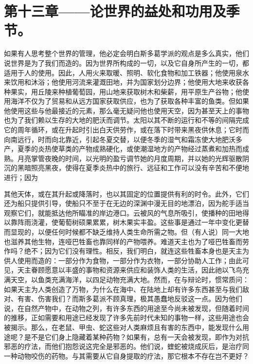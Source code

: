 \section{第十三章——论世界的益处和功用及季节。}

如果有人思考整个世界的管理，他必定会明白斯多葛学派的观点是多么真实，他们说世界是为了我们而造的。因为世界所构成的一切，以及它自身所产生的一切，都适用于人的使用。因此，人用火来取暖、照明、软化食物和加工铁器；他使用泉水来饮用和沐浴；他使用河流来灌溉田地，并为国家划分边界；他使用大地来收获各种果实，用丘陵来种植葡萄园，用山地来获取树木和柴薪，用平原生产谷物；他使用海洋不仅为了贸易和从远方国家获取供应，也为了获取各种丰富的鱼类。但如果他使用这些与他最接近的元素，那么毫无疑问他也使用天空，因为甚至天上的事物也为了我们赖以生存的大地的肥沃而调节。太阳以其不断的运行和不等的间隔完成它的周年循环，或在升起时引出白天供劳作，或在落下时带来黑夜供休息；它时而向南远行，时而向北靠近，引起冬夏交替，以便冬季的湿气和霜冻使大地肥沃多产，夏季的炎热使草类的产物成熟硬化，或使潮湿地方的产物经过蒸煮和加热而成熟。月亮掌管夜晚的时间，以光明的盈亏调节她的月度周期，并以她的光辉驱散阴沉的黑暗照亮黑夜，使得在夏季炎热中的旅行、远征和工作可以没有辛苦和不便地进行；因为\par

\par

其他天体，或在其升起或降落时，也以其固定的位置提供有利的时令。此外，它们还为船只提供引导，使船只不至于在无边的深渊中漫无目的地漂泊，因为舵手适当观察它们，就能抵达他所瞄准的岸边港口。云被风的气息所吸引，使播种的田地得以靠阵雨浇灌，使葡萄树硕果累累，树木果实丰盈。这些事是通过一年中变化更替而显现的，以便任何时候都不缺乏维持人类生命所需之物。但（有人说）同一大地也滋养其他生物，连哑巴牲畜也靠同样的产物喂养。难道天主也为了哑巴牲畜而劳作吗？绝不；因为它们没有理性。相反，我们明白，就连这些牲畜本身也是天主为供人使用而造的：一部分作为食物，一部分作为衣物，一部分协助人工作；由此可见，天主眷顾愿意以丰盛的事物和资源来供应和装饰人类的生活，因此祂以飞鸟充满天空，以鱼类充满海洋，以四足动物充满大地。然而，在与辩论时，惯常质问：如果天主为人类创造了万物，为什么在海中、在陆地上却有许多东西甚至与我们敌对、有害、伤害我们？而斯多葛派不顾真理，极其愚蠢地反驳这一点。因为他们说，在自然产物中，在动物之列，有许多东西的用途至今尚未被发现，但随着时间的推移，正如需要和用途已经发现了许多先前时代未知的事物一样，这些用途也会被揭示。那么，在老鼠、甲虫、蛇这些对人类麻烦且有害的东西中，能发现什么用途呢？是不是它们身上隐藏着某种药物？如果有，总有一天会被发现，即作为对抗邪恶的疗法，而他们抱怨说这完全是邪恶的。他们说，蝰蛇被烧成灰后，是治疗同一种动物咬伤的药物。与其需要从它自身提取的疗法，那它根本不存在岂不更好？\par

